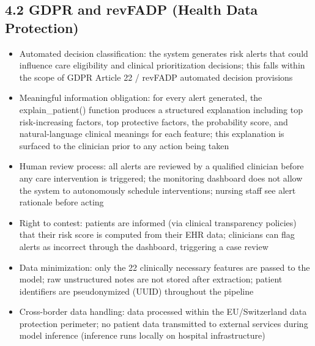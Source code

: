 \documentclass[11pt,a4paper]{article}
\begin{document}
\subsection{4.2 GDPR and revFADP (Health Data Protection)}
\begin{itemize}
\item Automated decision classification: the system generates risk alerts that could influence care eligibility and clinical prioritization decisions; this falls within the scope of GDPR Article 22 / revFADP automated decision provisions
\item Meaningful information obligation: for every alert generated, the explain\_patient() function produces a structured explanation including top risk-increasing factors, top protective factors, the probability score, and natural-language clinical meanings for each feature; this explanation is surfaced to the clinician prior to any action being taken
\item Human review process: all alerts are reviewed by a qualified clinician before any care intervention is triggered; the monitoring dashboard does not allow the system to autonomously schedule interventions; nursing staff see alert rationale before acting
\item Right to contest: patients are informed (via clinical transparency policies) that their risk score is computed from their EHR data; clinicians can flag alerts as incorrect through the dashboard, triggering a case review
\item Data minimization: only the 22 clinically necessary features are passed to the model; raw unstructured notes are not stored after extraction; patient identifiers are pseudonymized (UUID) throughout the pipeline
\item Cross-border data handling: data processed within the EU/Switzerland data protection perimeter; no patient data transmitted to external services during model inference (inference runs locally on hospital infrastructure)
\end{itemize}
\end{document}
